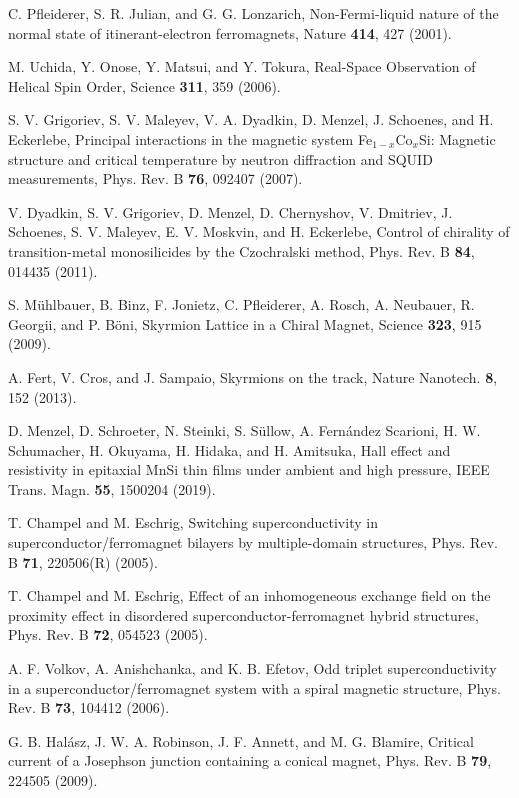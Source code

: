 \documentclass[prb,amsmath,amssymb,reprint]{revtex4-2}
\begin{document}
\begin{thebibliography}{99}
 C. Pfleiderer, S. R. Julian, and G. G. Lonzarich,
Non-Fermi-liquid nature of the normal state of itinerant-electron ferromagnets,
Nature \textbf{414}, 427 (2001).

 M. Uchida, Y. Onose, Y. Matsui, and Y. Tokura,
Real-Space Observation of Helical Spin Order,
Science
\textbf{311}, 359 (2006).

 S. V. Grigoriev, S. V. Maleyev, V. A. Dyadkin, D. Menzel,
J. Schoenes, and H. Eckerlebe,
Principal interactions in the magnetic system Fe$_{1-x}$Co$_x$Si: Magnetic structure and critical temperature by neutron diffraction and SQUID measurements,
Phys. Rev. B \textbf{76}, 092407 (2007).


 V. Dyadkin, S. V. Grigoriev, D. Menzel, D. Chernyshov, V. Dmitriev, J. Schoenes, S. V. Maleyev, E. V. Moskvin, and H. Eckerlebe,
Control of chirality of transition-metal monosilicides by the Czochralski method,
 Phys. Rev. B \textbf{84}, 014435 (2011).

 S. M\"{u}hlbauer, B. Binz, F. Jonietz, C.
Pfleiderer, A. Rosch, A. Neubauer, R. Georgii, and P. B\"{o}ni,
Skyrmion Lattice in a Chiral Magnet,
Science
\textbf{323}, 915 (2009).

 A. Fert, V. Cros, and J. Sampaio,
Skyrmions on the track,
Nature Nanotech.
\textbf{8}, 152 (2013).

 D. Menzel, D. Schroeter, N. Steinki, S. S\"{u}llow, A. Fern\'{a}ndez Scarioni, H. W. Schumacher, H. Okuyama, H. Hidaka, and H. Amitsuka,
Hall effect and resistivity in epitaxial MnSi thin films under ambient and high pressure,
IEEE Trans. Magn. \textbf{55}, 1500204 (2019).

 T. Champel and M. Eschrig,
Switching superconductivity in superconductor/ferromagnet bilayers by multiple-domain structures,
 Phys. Rev. B \textbf{71},
220506(R) (2005).

 T. Champel and M. Eschrig,
Effect of an inhomogeneous exchange field on the proximity effect in disordered superconductor-ferromagnet hybrid structures,
Phys. Rev. B \textbf{72}, 054523 (2005).

 A. F. Volkov, A. Anishchanka, and K. B. Efetov,
Odd triplet superconductivity in a superconductor/ferromagnet system with a spiral magnetic structure,
Phys. Rev. B \textbf{73}, 104412 (2006).

 G. B. Hal\'{a}sz, J. W. A. Robinson, J. F. Annett, and
M. G. Blamire,
Critical current of a Josephson junction containing a conical magnet,
Phys. Rev. B \textbf{79}, 224505 (2009).


\end{thebibliography}
\end{document}
